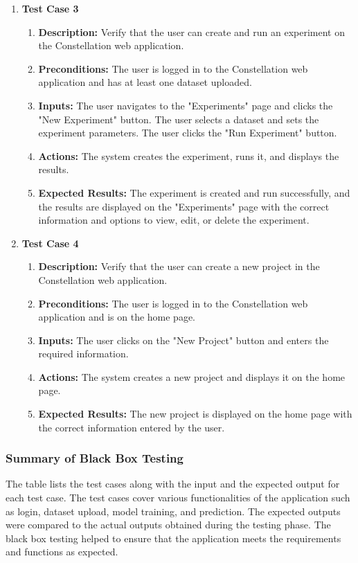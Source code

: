\documentclass[12pt,a4paper]{report}     %
\begin{document}
\begin{normalsize}
{{{{\begin{enumerate}
\item\textbf{Test Case 3}
\begin{enumerate}
\item \textbf{Description:} Verify that the user can create and run an experiment on the Constellation web application.
\item \textbf{Preconditions:} The user is logged in to the Constellation web application and has at least one dataset uploaded.
\item \textbf{Inputs:} The user navigates to the "Experiments" page and clicks the "New Experiment" button. The user selects a dataset and sets the experiment parameters. The user clicks the "Run Experiment" button.
\item \textbf{Actions:} The system creates the experiment, runs it, and displays the results.
\item \textbf{Expected Results:} The experiment is created and run successfully, and the results are displayed on the "Experiments" page with the correct information and options to view, edit, or delete the experiment.
\end{enumerate}
\item\textbf{Test Case 4}
\begin{enumerate}
    \item \textbf{Description:} Verify that the user can create a new project in the Constellation web application.
    \item \textbf{Preconditions:} The user is logged in to the Constellation web application and is on the home page.
    \item \textbf{Inputs:} The user clicks on the "New Project" button and enters the required information.
    \item \textbf{Actions:} The system creates a new project and displays it on the home page.
    \item \textbf{Expected Results:} The new project is displayed on the home page with the correct information entered by the user.
\end{enumerate}
\end{enumerate}
\subsubsection{Summary of Black Box Testing}
The table lists the test cases along with the input and the expected output for each test case. The test cases cover various functionalities of the application such as login, dataset upload, model training, and prediction. The expected outputs were compared to the actual outputs obtained during the testing phase. The black box testing helped to ensure that the application meets the requirements and functions as expected.

}}}}
\end{normalsize}
\end{document}
